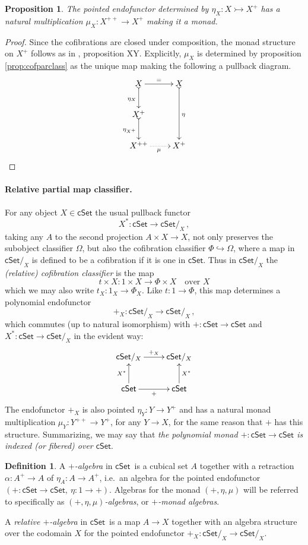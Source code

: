 \documentclass[12pt]{article}
\newcommand{\cSet}{\ensuremath{\mathsf{cSet}}}
\newcommand{\hook}{\ensuremath{\hookrightarrow}}
\newcommand{\mono}{\ensuremath{\rightarrowtail}}
\newcommand{\ra}{\ensuremath{\rightarrow}}
\newtheorem{proposition}[theorem]{Proposition}
\theoremstyle{remark}
\theoremstyle{definition}
\newtheorem{definition}[theorem]{Definition}
\begin{document}
\begin{proposition}\label{prop:plusmonad}
The pointed endofunctor determined by $\eta_X : X\mono X^+$ has a natural multiplication $\mu_X : X^{++} \ra X^+$ making it a monad.
\end{proposition}

\begin{proof}
Since the cofibrations are closed under composition, the monad structure on $X^+$ follows as in \cite{AN}, proposition XY.  Explicitly, $\mu_X$ is determined by proposition \ref{prop:cofparclass} as the unique map making the following a pullback diagram.
\[
\xymatrix{
X \ar@{>->}[d]_{\eta_X} \ar[r]^= & X \ar@{>->}[dd]^{\eta}\\
X^+ \ar@{>->}[d]_{\eta_{X^+}} & \\
X^{++} \ar@{.>}[r]_\mu & X^+
}
\]
\end{proof}

\paragraph{Relative partial map classifier.}

For any object $X\in\cSet$ the usual pullback functor $$X^* : \cSet \ra \cSet/_X\,,$$ taking any $A$ to the second projection $A\times X\ra X$, not only preserves the subobject classifier $\Omega$, but also the cofibration classifier $\Phi \hook \Omega$, where a map in $\cSet/_X$ is defined to be a cofibration if it is one in \cSet. Thus in $\cSet/_X$ the \emph{(relative) cofibration classifier} is the map
\[
t \times X : 1\times X \ra \Phi\times X	\quad\text{over $X$}
\]
which we may also write $t_X : 1_X \ra \Phi_X$.  Like $t : 1\ra \Phi$, this map determines a polynomial endofunctor  $$+_X : \cSet/_X \ra \cSet/_X\,,$$ which commutes (up to natural isomorphism) with $+ : \cSet \ra \cSet$ and $X^* : \cSet \ra \cSet/_X$ in the evident way:
\begin{equation}\label{diag:+fibered}
\xymatrix{
\cSet/_X \ar[r]^{+_X}& \cSet/_X \\
\cSet \ar[u]^{X^*} \ar[r]_+ & \ar[u]_{X^*}\cSet 
}
\end{equation}
The endofunctor $+_X$ is also pointed $\eta_Y : Y \ra Y^+$ and has a natural monad multiplication $\mu_Y : Y^{++} \ra Y^+$, for any $Y\ra X$, for the same reason that $+$ has this structure.  Summarizing, we may say that \emph{the polynomial monad $+ : \cSet \ra \cSet$ is indexed (or fibered) over \cSet}.

\begin{definition}\label{def:+alg}
A \emph{$+$-algebra} in \cSet\ is a cubical set $A$ together with a retraction $\alpha : A^+\ra A$ of $\eta_A : A \ra A^+$, i.e.\ an algebra for the pointed endofunctor $(+ : \cSet\ra \cSet,\ \eta : 1 \ra +)$.  Algebras for the monad $(+, \eta, \mu)$ will be referred to specifically as \emph{$(+, \eta, \mu)$-algebras}, or \emph{$+$-monad algebras}. 

A \emph{relative $+$-algebra} in \cSet\ is a map $A \ra X$ together with an algebra structure over the codomain $X$ for the pointed endofunctor $+_X : \cSet/_X \ra \cSet/_X$.
\end{definition}
\end{document}
